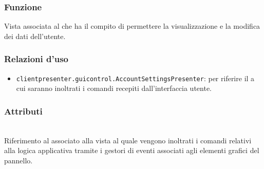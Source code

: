 \subsubsection*{Funzione}
Vista associata al   che ha il compito di permettere la visualizzazione e la modifica dei dati dell'utente.

\subsubsection*{Relazioni d'uso}
\begin{itemize}
  \item \texttt{clientpresenter.guicontrol.AccountSettingsPresenter}: per riferire il  a cui saranno inoltrati i comandi recepiti dall'interfaccia utente.
\end{itemize}

\subsubsection*{Attributi}
\begin{description}
  \item{}\\
  Riferimento al  associato alla vista al quale vengono inoltrati i comandi relativi alla logica applicativa tramite i gestori di eventi associati agli elementi grafici del pannello.
\end{description}

